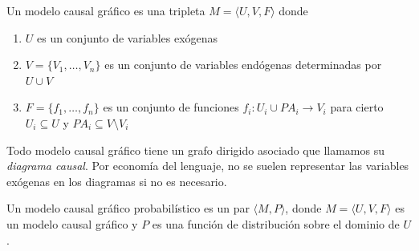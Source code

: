 \begin{definicion}\cite[sección 7.1.1]{pearl2009causality}
    \label{def:modelo_causal}
    Un modelo causal gráfico es una tripleta $M = \langle U, V, F \rangle$ donde
    \begin{enumerate}
        \item $U$ es un conjunto de variables exógenas
        \item $V = \{V_1, \ldots, V_n \}$ es un conjunto de variables endógenas determinadas por $U \cup V$
        \item $F = \{f_1, \ldots, f_n \}$ es un conjunto de funciones $f_i : U_i \cup PA_i \to V_i$ para
              cierto $U_i \subseteq U$ y $PA_i \subseteq V \setminus V_i$
    \end{enumerate}
    Todo modelo causal gráfico tiene un grafo dirigido asociado que llamamos su \emph{diagrama causal}.
    Por economía del lenguaje, no se suelen representar las variables exógenas en los diagramas si no
    es necesario.
\end{definicion}

\begin{definicion}\cite[7.1.6]{pearl2009causality}
    Un modelo causal gráfico probabilístico es un par $\langle M, P \rangle$, donde
    $M = \langle U, V, F \rangle$ es un modelo causal gráfico y $P$ es una función de distribución sobre el dominio de $U$.
\end{definicion}

